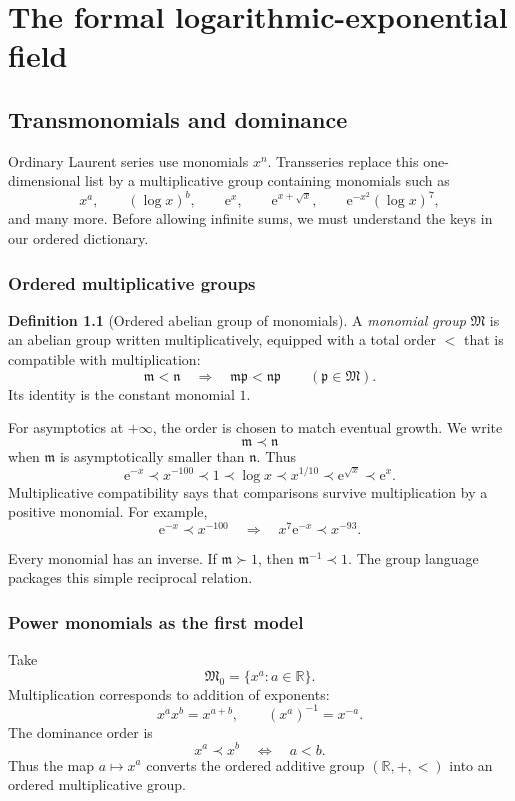 \documentclass[11pt,openany]{book}
\theoremstyle{definition}
\newtheorem{definition}{Definition}[chapter]
\theoremstyle{plain}
\theoremstyle{remark}
\newcommand{\R}{\mathbb{R}}
\newcommand{\M}{\mathfrak{M}}
\newcommand{\m}{\mathfrak{m}}
\newcommand{\n}{\mathfrak{n}}
\newcommand{\e}{\mathrm{e}}
\newcommand{\precdom}{\prec}
\newcommand{\succdom}{\succ}
\begin{document}
\part{The formal logarithmic-exponential field}

\chapter{Transmonomials and dominance}\label{ch:monomials}

Ordinary Laurent series use monomials $x^n$. Transseries replace this one-dimensional list by a multiplicative group containing monomials such as
\[
 x^a,\qquad (\log x)^b,\qquad \e^{x},\qquad
 \e^{x+\sqrt{x}},\qquad \e^{-x^2}(\log x)^7,
\]
and many more. Before allowing infinite sums, we must understand the keys in our ordered dictionary.

\section{Ordered multiplicative groups}

\begin{definition}[Ordered abelian group of monomials]
A \emph{monomial group} $\M$ is an abelian group written multiplicatively, equipped with a total order $<$ that is compatible with multiplication:
\[
 \m<\n\quad\Longrightarrow\quad \m\mathfrak p<\n\mathfrak p
 \qquad(\mathfrak p\in\M).
\]
Its identity is the constant monomial $1$.
\end{definition}

For asymptotics at $+\infty$, the order is chosen to match eventual growth. We write
\[
 \m\precdom\n
\]
when $\m$ is asymptotically smaller than $\n$. Thus
\[
 \e^{-x}\precdom x^{-100}\precdom1\precdom\log x\precdom x^{1/10}\precdom\e^{\sqrt{x}}\precdom\e^x.
\]
Multiplicative compatibility says that comparisons survive multiplication by a positive monomial. For example,
\[
 \e^{-x}\precdom x^{-100}
 \quad\Longrightarrow\quad
 x^7\e^{-x}\precdom x^{-93}.
\]

Every monomial has an inverse. If $\m\succdom1$, then $\m^{-1}\precdom1$. The group language packages this simple reciprocal relation.

\section{Power monomials as the first model}

Take
\[
 \M_0=\{x^a:a\in\R\}.
\]
Multiplication corresponds to addition of exponents:
\[
 x^a x^b=x^{a+b},
 \qquad
 (x^a)^{-1}=x^{-a}.
\]
The dominance order is
\[
 x^a\precdom x^b\quad\Longleftrightarrow\quad a<b.
\]
Thus the map $a\mapsto x^a$ converts the ordered additive group $(\R,+,<)$ into an ordered multiplicative group.
\end{document}

